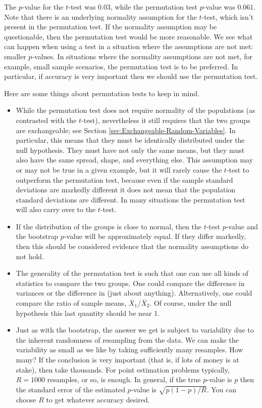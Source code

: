 \documentclass[captions=tableheading]{scrbook}
\begin{document}
The \(p\)-value for the \(t\)-test was \(  0.03 \), while the permutation test \(p\)-value was \(  0.061 \). Note that there is an underlying normality assumption for the \(t\)-test, which isn't present in the permutation test. If the normality assumption may be questionable, then the permutation test would be more reasonable. We see what can happen when using a test in a situation where the assumptions are not met: smaller \(p\)-values. In situations where the normality assumptions are not met, for example, small sample scenarios, the permutation test is to be preferred. In particular, if accuracy is very important then we should use the permutation test. 

\begin{rem}
Here are some things about permutation tests to keep in mind.
\begin{itemize}
\item While the permutation test does not require normality of the populations (as contrasted with the \(t\)-test), nevertheless it still requires that the two groups are exchangeable; see Section \ref{sec:Exchangeable-Random-Variables}. In particular, this means that they must be identically distributed under the null hypothesis. They must have not only the same means, but they must also have the same spread, shape, and everything else. This assumption may or may not be true in a given example, but it will rarely cause the \(t\)-test to outperform the permutation test, because even if the sample standard deviations are markedly different it does not mean that the population standard deviations are different. In many situations the permutation test will also carry over to the \(t\)-test.
\item If the distribution of the groups is close to normal, then the \(t\)-test \(p\)-value and the bootstrap \(p\)-value will be approximately equal. If they differ markedly, then this should be considered evidence that the normality assumptions do not hold.
\item The generality of the permutation test is such that one can use all kinds of statistics to compare the two groups. One could compare the difference in variances or the difference in (just about anything). Alternatively, one could compare the ratio of sample means, \(\overline{X}_{1}/\overline{X}_{2}\). Of course, under the null hypothesis this last quantity should be near 1.
\item Just as with the bootstrap, the answer we get is subject to variability due to the inherent randomness of resampling from the data. We can make the variability as small as we like by taking sufficiently many resamples. How many? If the conclusion is very important (that is, if lots of money is at stake), then take thousands. For point estimation problems typically, \(R=1000\) resamples, or so, is enough. In general, if the true \(p\)-value is \(p\) then the standard error of the estimated \(p\)-value is \(\sqrt{p(1-p)/R}\). You can choose \(R\) to get whatever accuracy desired.
\end{itemize}
\end{rem}
\end{document}
